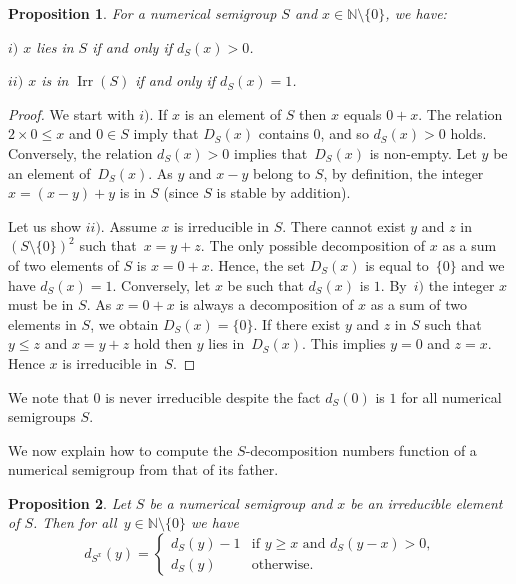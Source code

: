 \documentclass[reqno]{amsart}
\theoremstyle{plain}
\newtheorem{prop}{Proposition}[section]
\theoremstyle{definition}
\renewcommand{\leq}{\leqslant}
\renewcommand{\geq}{\geqslant}
\newcommand{\NN}{\mathbb{N}}
\DeclareMathOperator{\Irr}{Irr}
\begin{document}
\begin{prop}
\label{P:Dandd}
For a numerical semigroup $S$ and $x\in\NN\setminus\{0\}$, we have:

 $i)$ $x$ lies in $S$ if and only if $d_S(x)>0$.

 $ii)$ $x$ is in $\Irr(S)$ if and only if $d_S(x)=1$.
\end{prop}

\begin{proof}
We start with $i)$. If $x$ is an element of $S$ then $x$ equals $0+x$. 
The relation~$2\times 0\leq x$ and $0\in S$ imply that $D_S(x)$ contains $0$, and so $d_S(x)>0$ holds.
Conversely, the relation  $d_S(x)>0$  implies that~$D_S(x)$ is non-empty. 
Let $y$ be an element of~$D_S(x)$. 
As $y$ and $x-y$ belong to  $S$, by definition, the integer $x=(x-y)+y$ is in $S$  (since $S$ is stable by addition).

Let us show $ii)$. 
Assume $x$ is irreducible in $S$.
There cannot exist $y$ and $z$ in~$(S\setminus\{0\})^2$ such that~$x=y+z$. 
The only possible decomposition of $x$ as a sum of two elements of $S$ is $x=0+x$. 
Hence, the set $D_S(x)$ is equal to~$\{0\}$ and we have $d_S(x)=1$. 
Conversely, let $x$ be such that $d_S(x)$ is $1$. 
By~$i)$ the  integer $x$ must be in $S$. 
As $x=0+x$ is always a decomposition of $x$ as a sum of two elements in $S$, we obtain $D_S(x)=\{0\}$.
If there exist $y$ and $z$ in $S$ such that $y\leq z$ and $x=y+z$ hold then $y$ lies in~$D_S(x)$. 
This implies $y=0$ and $z=x$. 
Hence $x$ is irreducible in~$S$.
\end{proof}

We note  that $0$ is never irreducible despite the fact $d_S(0)$ is $1$ for all numerical semigroups $S$.

We now explain how to compute the $S$-decomposition numbers function of a numerical semigroup  from that of its father.

\begin{prop}
Let $S$ be a numerical semigroup and $x$ be an irreducible element of $S$. 
Then for all~$y\in \NN\setminus\{0\}$ we have
\[
d_{S^x}(y)=\begin{cases}
d_S(y)-1&\text{if $y\geq x$ and $d_S(y-x)>0$,}\\
d_S(y) &\text{otherwise.}
\end{cases}
\] 
\end{prop}
\end{document}
